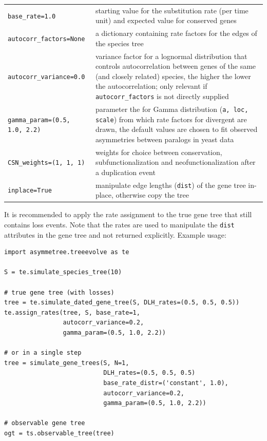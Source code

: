 \documentclass[hidelinks,11pt]{article}
\begin{document}
\vspace{3mm}
{\small\centering
\begin{longtable}{ p{4.0cm} p{9cm} }
	\texttt{base\_rate=1.0} & starting value for the substitution rate (per time unit) and expected value for conserved genes\\
	\texttt{autocorr\_factors=None}  & a dictionary containing rate factors for the edges of the species tree\\
	\texttt{autocorr\_variance=0.0}  & variance factor for a lognormal distribution that controls autocorrelation between genes of the same (and closely related) species, the higher the lower the auto\-corre\-la\-tion; only relevant if \texttt{autocorr\_factors} is not directly supplied\\
	\texttt{gamma\_param=\newline (0.5, 1.0, 2.2)}  & parameter the for Gamma distribution (\texttt{a, loc, scale}) from which rate factors for divergent are drawn, the default values are chosen to fit observed asymmetries between paralogs in yeast data \citep{byrne2007}\\
	\texttt{CSN\_weights=(1, 1, 1)}  & weights for choice between conservation,
	subfunctionalization and neofunctionalization after a duplication event\\
	\texttt{inplace=True}  & manipulate edge lengths (\texttt{dist}) of the gene tree in-place, otherwise copy the tree\\
\end{longtable}
}
\vspace{3mm}

\noindent
It is recommended to apply the rate assignment to the true gene tree that still contains loss events.
Note that the rates are used to manipulate the \texttt{dist} attributes in the gene tree and not returned explicitly.
Example usage:
\begin{adjustwidth}{1cm}{1cm}\vspace{2mm}
\begin{verbatim}
import asymmetree.treeevolve as te

S = te.simulate_species_tree(10)

# true gene tree (with losses)
tree = te.simulate_dated_gene_tree(S, DLH_rates=(0.5, 0.5, 0.5))
te.assign_rates(tree, S, base_rate=1,
                autocorr_variance=0.2,
                gamma_param=(0.5, 1.0, 2.2))
                
# or in a single step
tree = simulate_gene_trees(S, N=1,
                           DLH_rates=(0.5, 0.5, 0.5)
                           base_rate_distr=('constant', 1.0),
                           autocorr_variance=0.2,
                           gamma_param=(0.5, 1.0, 2.2))

# observable gene tree
ogt = ts.observable_tree(tree)
\end{verbatim}
\end{adjustwidth}
\end{document}
